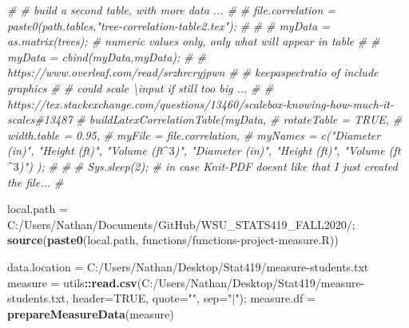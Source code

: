 \documentclass[]{article}
\newenvironment{Shaded}{\begin{snugshade}}{\end{snugshade}}
\newcommand{\CommentTok}[1]{\textcolor[rgb]{0.56,0.35,0.01}{\textit{#1}}}
\newcommand{\DataTypeTok}[1]{\textcolor[rgb]{0.13,0.29,0.53}{#1}}
\newcommand{\KeywordTok}[1]{\textcolor[rgb]{0.13,0.29,0.53}{\textbf{#1}}}
\newcommand{\NormalTok}[1]{#1}
\newcommand{\OperatorTok}[1]{\textcolor[rgb]{0.81,0.36,0.00}{\textbf{#1}}}
\newcommand{\OtherTok}[1]{\textcolor[rgb]{0.56,0.35,0.01}{#1}}
\newcommand{\StringTok}[1]{\textcolor[rgb]{0.31,0.60,0.02}{#1}}
\begin{document}
\newpage



\newpage

\begin{Shaded}
\begin{Highlighting}[]
\CommentTok{\# \# build a second table, with more data ... }
\CommentTok{\# }
\CommentTok{\# file.correlation = paste0(path.tables,"tree{-}correlation{-}table2.tex");}
\CommentTok{\# }
\CommentTok{\# }
\CommentTok{\# myData = as.matrix(trees);  \# numeric values only, only what will appear in table}
\CommentTok{\# }
\CommentTok{\# myData = cbind(myData,myData);}
\CommentTok{\# \# https://www.overleaf.com/read/srzhrcryjpwn}
\CommentTok{\# \# keepaspectratio of include graphics }
\CommentTok{\# \# could scale \textbackslash{}input if still too big ...}
\CommentTok{\# \# https://tex.stackexchange.com/questions/13460/scalebox{-}knowing{-}how{-}much{-}it{-}scales\#13487}
\CommentTok{\# buildLatexCorrelationTable(myData, }
\CommentTok{\#   rotateTable = TRUE,}
\CommentTok{\#   width.table = 0.95,}
\CommentTok{\#   myFile = file.correlation,}
\CommentTok{\#   myNames = c("Diameter (in)", "Height (ft)", "Volume (ft$\^{}3$)", "Diameter (in)", "Height (ft)", "Volume (ft$\^{}3$)") );}
\CommentTok{\# }
\CommentTok{\# }
\CommentTok{\# Sys.sleep(2); \# in case Knit{-}PDF doesn\textquotesingle{}t like that I just created the file...}
\CommentTok{\# }
\end{Highlighting}
\end{Shaded}

\newpage



\newpage

\begin{Shaded}
\begin{Highlighting}[]
\NormalTok{local.path =}\StringTok{ \textquotesingle{}C:/Users/Nathan/Documents/GitHub/WSU\_STATS419\_FALL2020/\textquotesingle{}}\NormalTok{;}
\KeywordTok{source}\NormalTok{(}\KeywordTok{paste0}\NormalTok{(local.path, }\StringTok{\textquotesingle{}functions/functions{-}project{-}measure.R\textquotesingle{}}\NormalTok{))}

\NormalTok{data.location =}\StringTok{ \textquotesingle{}C:/Users/Nathan/Desktop/Stat419/measure{-}students.txt\textquotesingle{}}
\NormalTok{measure =}\StringTok{ }\NormalTok{utils}\OperatorTok{::}\KeywordTok{read.csv}\NormalTok{(}\StringTok{\textquotesingle{}C:/Users/Nathan/Desktop/Stat419/measure{-}students.txt\textquotesingle{}}\NormalTok{, }\DataTypeTok{header=}\OtherTok{TRUE}\NormalTok{, }\DataTypeTok{quote=}\StringTok{""}\NormalTok{, }\DataTypeTok{sep=}\StringTok{"|"}\NormalTok{);}
\NormalTok{measure.df =}\StringTok{ }\KeywordTok{prepareMeasureData}\NormalTok{(measure)}
\end{Highlighting}
\end{Shaded}
\end{document}
